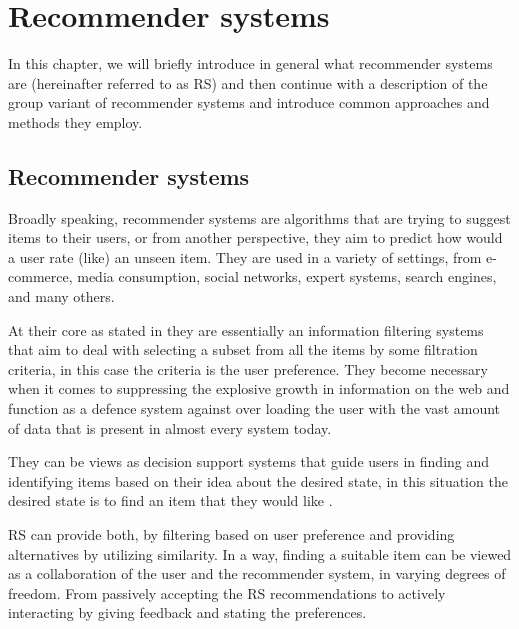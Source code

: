 
\chapter{Recommender systems} \label{chap:recommender_systems}
In this chapter, we will briefly introduce in general what recommender systems are (hereinafter referred to as RS) and then continue with a description of the group variant of recommender systems and introduce common approaches and methods they employ.


\section{Recommender systems}\label{sec:01_rec_sys}
Broadly speaking, recommender systems are algorithms that are trying to suggest items to their users, or from another perspective, they aim to predict how would a user rate (like) an unseen item. They are used in a variety of settings, from e-commerce, media consumption, social networks, expert systems, search engines, and many others.

At their core as stated in \cite{wiki:Recommender_system} they are essentially an information filtering systems that aim to deal with selecting a subset from all the items by some filtration criteria, in this case the criteria is the user preference. They become necessary when it comes to suppressing the explosive growth in information on the web and function as a defence system against over loading the user with the vast amount of data that is present in almost every system today.

They can be views as decision support systems that guide users in finding and identifying items based on their idea about the desired state, in this situation the desired state is to find an item that they would like \cite{grouprecommendersystems_felfernig2018group}.

RS can provide both, by filtering based on user preference and providing alternatives by utilizing similarity. In a way, finding a suitable item can be viewed as a collaboration of the user and the recommender system, in varying degrees of freedom. From passively accepting the RS recommendations to actively interacting by giving feedback and stating the preferences.

